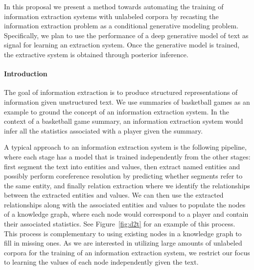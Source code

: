 \documentclass[12pt]{article}
\begin{document}
In this proposal we present a method towards automating the
training of information extraction systems with unlabeled corpora
by recasting the information extraction problem as a conditional generative modeling problem.
Specifically, we plan to use the performance of a deep generative model of text 
as signal for learning an extraction system.
Once the generative model is trained, the extractive system is obtained through posterior inference.

\paragraph{Introduction}
The goal of information extraction is to produce structured representations of information
given unstructured text.
We use summaries of basketball games as an example to ground the concept of an
information extraction system.
In the context of a basketball game summary, an information extraction system
would infer all the statistics associated with a player given the summary.

A typical approach to an information extraction system is the following pipeline,
where each stage has a model that is trained independently from the other stages:
first segment the text into entities and values,
then extract named entities and possibly perform
coreference resolution by predicting whether segments refer to the same entity, 
and finally relation extraction where we identify the relationships between the extracted
entities and values.
We can then use the extracted relationships along with the associated entities and values
to populate the nodes of a knowledge graph, where each node would
correspond to a player and contain their associated statistics.
See Figure~\ref{fig:d2t} for an example of this process.
This process is complementary to using existing nodes in a knowledge graph
to fill in missing ones.
As we are interested in utilizing large amounts of unlabeled corpora for 
the training of an information extraction system, we restrict our focus
to learning the values of each node independently given the text.
\end{document}
